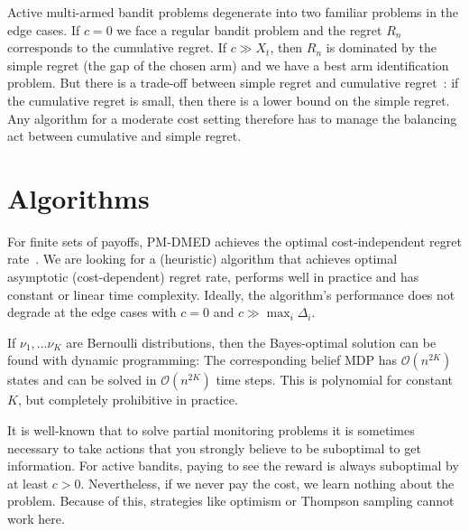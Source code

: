 \documentclass[a4paper]{article}
\def\regret{R}
\begin{document}
Active multi-armed bandit problems degenerate into two familiar problems in the edge cases.
If $c = 0$ we face a regular bandit problem and the regret $\regret_n$ corresponds to the cumulative regret.
If $c \gg X_t$,
then $\regret_n$ is dominated by the simple regret
(the gap of the chosen arm) and
we have a best arm identification problem.
But there is a trade-off between
simple regret and cumulative regret~\citep[Thm.~1]{Bubeck11}:
if the cumulative regret is small,
then there is a lower bound on the simple regret.
Any algorithm for a moderate cost setting therefore
has to manage the balancing act between cumulative and simple regret.


\section{Algorithms}

For finite sets of payoffs,
PM-DMED achieves the optimal cost-independent regret rate~\citep{Komiyama15}.
We are looking for a (heuristic) algorithm that achieves optimal asymptotic (cost-dependent) regret rate,
performs well in practice and has constant or linear time complexity.
Ideally, the algorithm's performance does not degrade at the edge cases with $c = 0$ and $c \gg \max_i \Delta_i$.

If $\nu_1, \ldots \nu_K$ are Bernoulli distributions,
then the Bayes-optimal solution
can be found with dynamic programming:
The corresponding belief MDP has $\mathcal{O}(n^{2K})$ states
and can be solved in $\mathcal{O}(n^{2K})$ time steps.
This is polynomial for constant $K$,
but completely prohibitive in practice.

It is well-known that to solve partial monitoring problems
it is sometimes necessary to take actions that you strongly believe to be suboptimal to get information.
For active bandits, paying to see the reward is always suboptimal
by at least $c > 0$.
Nevertheless, if we never pay the cost, we learn nothing about the problem.
Because of this, strategies like optimism or Thompson sampling cannot work here.
\end{document}
